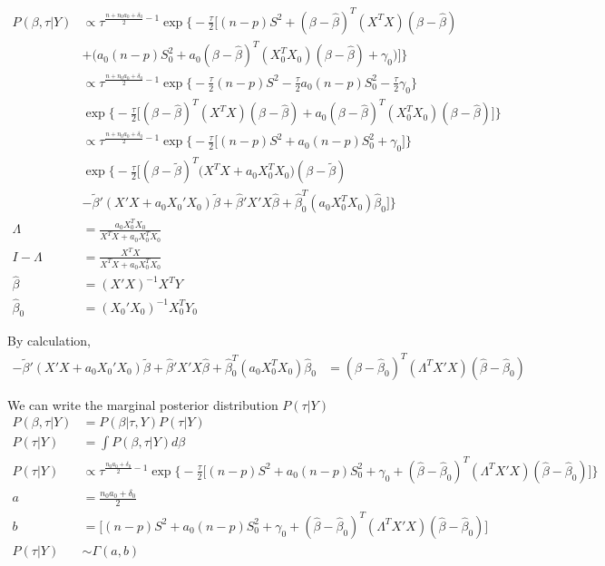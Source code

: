\begin{itemize}
\begin{align*}
	P(\beta, \tau |Y) & \propto \tau^{\frac{n + n_0 a_0 + \delta_0}{2} -1} \exp \Big \{ -\frac{\tau}{2} \Big[ (n-p) S^2 + (\beta - \hat{\beta})^T(X^T X) (\beta - \hat{\beta}) \\
	& + \Big( a_0  (n-p) S_0^2 + a_0  (\beta - \hat{\beta})^T(X_0^T X_0) (\beta - \hat{\beta})  + \gamma_0 \Big)  \Big ] \Big \} \\
	& \propto \tau^{\frac{n + n_0 a_0 + \delta_0}{2} -1} \exp \Big \{ -\frac{\tau}{2}  (n-p) S^2  - \frac{\tau}{2} a_0  (n-p) S_0^2 - \frac{\tau}{2}  \gamma_0 \Big \}  \\
	& \exp \Big \{  -\frac{\tau}{2} \Big[ (\beta - \hat{\beta})^T(X^T X) (\beta - \hat{\beta}) +  a_0  (\beta - \hat{\beta})^T(X_0^T X_0) (\beta - \hat{\beta}) \Big ] \Big \} \\
	& \propto \tau^{\frac{n + n_0 a_0 + \delta_0}{2} -1} \exp \Big \{ -\frac{\tau}{2} \Big[ (n-p) S^2  + a_0  (n-p) S_0^2 + \gamma_0 \Big ]  \Big \}  \\
	& \exp \Big \{  -\frac{\tau}{2} \Big[ (\beta - \tilde{\beta})^T \Big (X^T X +  a_0 X_0^T X_0 \Big ) (\beta - \tilde{\beta}) \\
	& - \tilde{\beta}' (X'X + a_0 X_0'X_0)  \tilde{\beta} + \hat{\beta}' X'X \hat{\beta} + \hat{\beta}_0^T (a_0 X_0^TX_0) \hat{\beta}_0 \Big ] \Big \} \\
	\Lambda &= \frac{a_0 X_0^T X_0}{X^T X +  a_0 X_0^T X_0} \\
	I - \Lambda &=  \frac{X^T X}{X^T X +  a_0 X_0^T X_0} \\
	\hat{\beta} & = (X'X)^{-1}X^TY \\
	\hat{\beta}_0 & = (X_0'X_0)^{-1}X_0^TY_0 
 \end{align*}
 
 By calculation,
 \begin{align*}
 - \tilde{\beta}' (X'X + a_0 X_0'X_0)  \tilde{\beta} + \hat{\beta}' X'X \hat{\beta} + \hat{\beta}_0^T (a_0 X_0^TX_0) \hat{\beta}_0 &= (\hat{\beta} - \hat{\beta}_0)^T(\Lambda^T X'X) (\hat{\beta} - \hat{\beta}_0)
 \end{align*}
 
 We can write the marginal posterior distribution $P(\tau | Y) $
 \begin{align*}
	P( \beta, \tau | Y) &= P(\beta | \tau, Y) P(\tau | Y) \\
	P(\tau | Y) &= \int P( \beta, \tau | Y) d\beta \\
	P(\tau | Y) & \propto \tau^{\frac{n_0 a_0 + \delta_0}{2} -1} \exp \Big \{ -\frac{\tau}{2} \Big[ (n-p) S^2  + a_0  (n-p) S_0^2 + \gamma_0 + (\hat{\beta} - \hat{\beta}_0)^T(\Lambda^T X'X) (\hat{\beta} - \hat{\beta}_0) \Big ] \Big \}  \\
	a &= \frac{ n_0 a_0 + \delta_0}{2} \\
	b &= \Big[ (n-p) S^2  + a_0  (n-p) S_0^2 + \gamma_0 + (\hat{\beta} - \hat{\beta}_0)^T(\Lambda^T X'X) (\hat{\beta} - \hat{\beta}_0) \Big ] \\
	P(\tau | Y) & \sim \Gamma (a, b)
 \end{align*}
 

\end{itemize}
